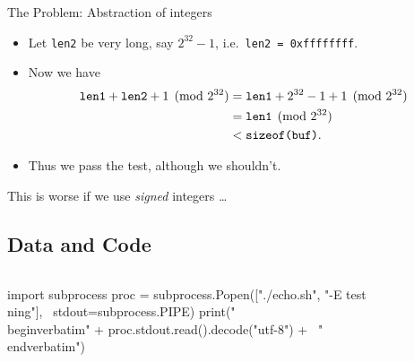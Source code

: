 \begin{frame}
  \begin{alertblock}{The Problem: Abstraction of integers}
    \begin{itemize}
      \item Let \texttt{len2} be very long, say \(2^{32} - 1\), i.e.\ 
        \texttt{len2 = 0xffffffff}.

      \item Now we have
        \begin{align*}
          \text{\texttt{len1}} + \text{\texttt{len2}} 
          + 1 \pmod{2^{32}}
          &= \text{\texttt{len1}} + 2^{32} - 1 + 1 \pmod{2^{32}} \\
          &= \text{\texttt{len1}} \pmod{2^{32}} \\
          &< \text{\texttt{sizeof(buf)}}.
        \end{align*}

      \item Thus we pass the test, although we shouldn't.
    \end{itemize}
  \end{alertblock}
\end{frame}

\begin{frame}
  \begin{remark}
    This is worse if we use \emph{signed} integers \dots
  \end{remark}
\end{frame}

\subsection{Data and Code}

\begin{frame}[fragile]
  \begin{example}
    \inputminted{sh}{echo.sh}
    \begin{pycode}[echo.sh]
import subprocess
proc = subprocess.Popen(["./echo.sh", "-E test\\ning"], \
stdout=subprocess.PIPE)
print("\\begin{verbatim}" + proc.stdout.read().decode("utf-8") + \
"\\end{verbatim}")
    \end{pycode}
  \end{example}
\end{frame}

